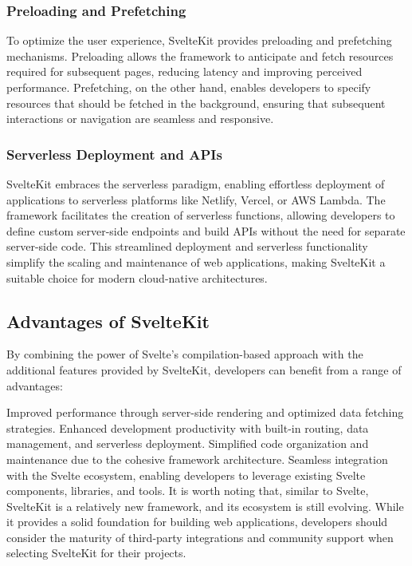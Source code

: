 \subsubsection{Preloading and Prefetching}

To optimize the user experience, SvelteKit provides preloading and prefetching mechanisms. Preloading allows the framework to anticipate and fetch resources required for subsequent pages, reducing latency and improving perceived performance. Prefetching, on the other hand, enables developers to specify resources that should be fetched in the background, ensuring that subsequent interactions or navigation are seamless and responsive.

\subsubsection{Serverless Deployment and APIs}

SvelteKit embraces the serverless paradigm, enabling effortless deployment of applications to serverless platforms like Netlify, Vercel, or AWS Lambda. The framework facilitates the creation of serverless functions, allowing developers to define custom server-side endpoints and build APIs without the need for separate server-side code. This streamlined deployment and serverless functionality simplify the scaling and maintenance of web applications, making SvelteKit a suitable choice for modern cloud-native architectures.

\subsection{Advantages of SvelteKit}

By combining the power of Svelte's compilation-based approach with the additional features provided by SvelteKit, developers can benefit from a range of advantages:

Improved performance through server-side rendering and optimized data fetching strategies.
Enhanced development productivity with built-in routing, data management, and serverless deployment.
Simplified code organization and maintenance due to the cohesive framework architecture.
Seamless integration with the Svelte ecosystem, enabling developers to leverage existing Svelte components, libraries, and tools.
It is worth noting that, similar to Svelte, SvelteKit is a relatively new framework, and its ecosystem is still evolving. While it provides a solid foundation for building web applications, developers should consider the maturity of third-party integrations and community support when selecting SvelteKit for their projects.

